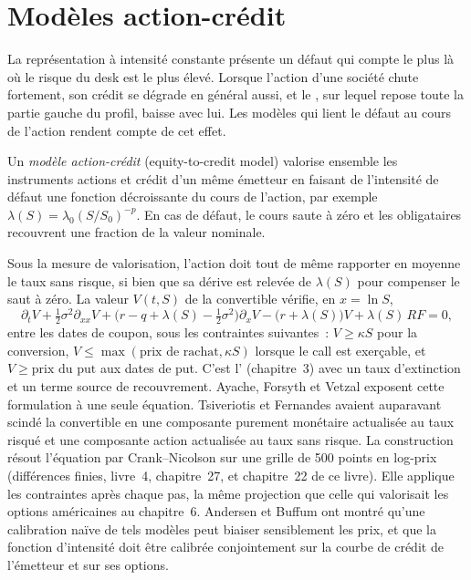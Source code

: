\section{Modèles action-crédit}

La représentation à intensité constante présente un défaut qui compte le plus là où le risque du desk est le plus élevé. Lorsque l'action d'une société chute fortement, son
crédit se dégrade en général aussi, et le , sur lequel repose toute la partie gauche du profil, baisse avec lui. Les modèles qui lient
le défaut au cours de l'action rendent compte de cet effet.

\begin{definition}\label{def:dv:convertibles-and-the-credit-equity-link:e2c}
Un \emph{modèle action-crédit} (equity-to-credit model) valorise ensemble les instruments actions et crédit d'un même émetteur en faisant de
l'intensité de défaut une fonction décroissante du cours de l'action, par exemple $\lambda(S)=\lambda_0(S/S_0)^{-p}$. En cas de défaut, le cours
saute à zéro et les obligataires recouvrent une fraction de la valeur nominale.
\end{definition}

Sous la mesure de valorisation, l'action doit tout de même rapporter en moyenne le taux sans risque, si bien que sa dérive est relevée de $\lambda(S)$ pour compenser
le saut à zéro. La valeur $V(t,S)$ de la convertible vérifie, en $x=\ln S$,
\[
\partial_tV+\tfrac12\sigma^2\partial_{xx}V+\bigl(r-q+\lambda(S)-\tfrac12\sigma^2\bigr)\partial_xV-\bigl(r+\lambda(S)\bigr)V+\lambda(S)\,RF=0,
\]
entre les dates de coupon, sous les contraintes suivantes~: $V\ge\kappa S$ pour la conversion, $V\le\max(\text{prix de rachat},\kappa S)$ lorsque le call est exerçable, et
$V\ge\text{prix du put}$ aux dates de put. C'est l' (chapitre~3) avec un taux d'extinction et un terme source de recouvrement. Ayache, Forsyth
et Vetzal exposent cette formulation à une seule équation. Tsiveriotis et Fernandes avaient auparavant scindé la convertible en une composante purement monétaire
actualisée au taux risqué et une composante action actualisée au taux sans risque. La construction résout l'équation par Crank--Nicolson sur une
grille de 500 points en log-prix (différences finies, livre~4, chapitre~27, et chapitre~22 de ce livre). Elle applique les contraintes après
chaque pas, la même projection que celle qui valorisait les options américaines au chapitre~6. Andersen et Buffum ont montré qu'une calibration naïve de tels modèles
peut biaiser sensiblement les prix, et que la fonction d'intensité doit être calibrée conjointement sur la courbe de crédit de l'émetteur et sur ses options.

